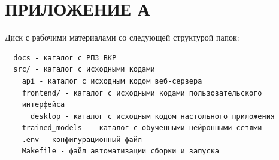 \chapter*{ПРИЛОЖЕНИЕ А}

Диск с рабочими материалами со следующей структурой папок:
\begin{verbatim}
  docs - каталог с РПЗ ВКР
  src/ - каталог с исходными кодами
    api - каталог с исходным кодом веб-сервера
    frontend/ - каталог с исходными кодами пользовательского
    интерфейса
      desktop - каталог с исходным кодом настольного приложения
    trained_models  - каталог с обученными нейронными сетями
    .env - конфигурационный файл
    Makefile - файл автоматизации сборки и запуска
\end{verbatim}